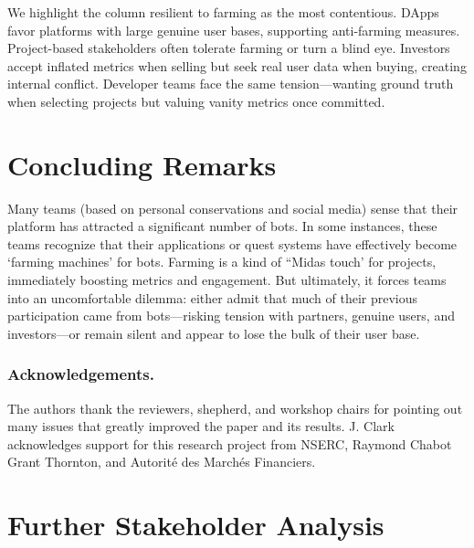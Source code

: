 We highlight the column resilient to farming as the most contentious. DApps favor platforms with large genuine user bases, supporting anti-farming measures. Project-based stakeholders often tolerate farming or turn a blind eye. Investors accept inflated metrics when selling but seek real user data when buying, creating internal conflict. Developer teams face the same tension—wanting ground truth when selecting projects but valuing vanity metrics once committed.


\section{Concluding Remarks}

Many teams (based on personal conservations and social media) sense that their platform has attracted a significant number of bots. In some instances, these teams recognize that their applications or quest systems have effectively become `farming machines' for bots. Farming is a kind of ``Midas touch' for projects, immediately boosting metrics and engagement. But ultimately, it forces teams into an uncomfortable dilemma: either admit that much of their previous participation came from bots---risking tension with partners, genuine users, and investors---or remain silent and appear to lose the bulk of their user base.


\subsubsection*{Acknowledgements.} 

The authors thank the reviewers, shepherd, and workshop chairs for pointing out many issues that greatly improved the paper and its results. J. Clark acknowledges support for this research project from NSERC, Raymond Chabot Grant Thornton, and Autorité des Marchés Financiers. 



\nocite{*}


\clearpage
\appendix

\section{Further Stakeholder Analysis} 

